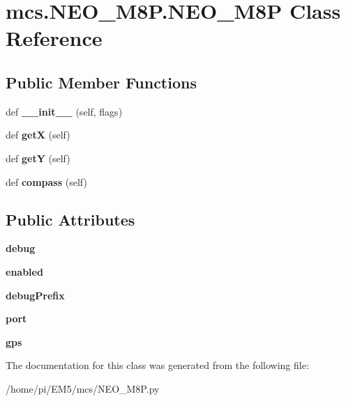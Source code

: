 \hypertarget{classmcs_1_1NEO__M8P_1_1NEO__M8P}{}\section{mcs.\+N\+E\+O\+\_\+\+M8\+P.\+N\+E\+O\+\_\+\+M8P Class Reference}
\label{classmcs_1_1NEO__M8P_1_1NEO__M8P}
\subsection*{Public Member Functions}
\begin{DoxyCompactItemize}
\item 
\mbox{\label{classmcs_1_1NEO__M8P_1_1NEO__M8P_afb2f89249786148ebf84e1b7b90ca575}} 
def {\bfseries \+\_\+\+\_\+init\+\_\+\+\_\+} (self, flags)
\item 
\mbox{\label{classmcs_1_1NEO__M8P_1_1NEO__M8P_a3c45af881d232f3f1f9f6545e85eb48c}} 
def {\bfseries getX} (self)
\item 
\mbox{\label{classmcs_1_1NEO__M8P_1_1NEO__M8P_a16ca5567136abc68ac8af0ccee9d4eac}} 
def {\bfseries getY} (self)
\item 
\mbox{\label{classmcs_1_1NEO__M8P_1_1NEO__M8P_ab88106f30bde6b04c25afff3acbe338c}} 
def {\bfseries compass} (self)
\end{DoxyCompactItemize}
\subsection*{Public Attributes}
\begin{DoxyCompactItemize}
\item 
\mbox{\label{classmcs_1_1NEO__M8P_1_1NEO__M8P_a36bd401d6ef861d2815e1b108e9d4cd2}} 
{\bfseries debug}
\item 
\mbox{\label{classmcs_1_1NEO__M8P_1_1NEO__M8P_a17881d47f2783ea1b2e63faeb798d1fe}} 
{\bfseries enabled}
\item 
\mbox{\label{classmcs_1_1NEO__M8P_1_1NEO__M8P_aa28e5ada44a531e5ba5a73c66a9abea0}} 
{\bfseries debug\+Prefix}
\item 
\mbox{\label{classmcs_1_1NEO__M8P_1_1NEO__M8P_aeb97df27c302b0420bc9245e0bd01695}} 
{\bfseries port}
\item 
\mbox{\label{classmcs_1_1NEO__M8P_1_1NEO__M8P_abf3338e2f82c464f1b4ada854e6cb67d}} 
{\bfseries gps}
\end{DoxyCompactItemize}


The documentation for this class was generated from the following file\+:\begin{DoxyCompactItemize}
\item 
/home/pi/\+E\+M5/mcs/N\+E\+O\+\_\+\+M8\+P.\+py\end{DoxyCompactItemize}
